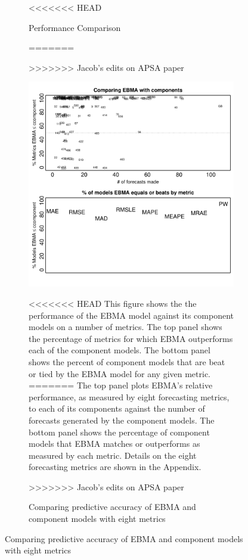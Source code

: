 \documentclass[12pt,fullpage,endnotes]{article}
\begin{document}
\begin{figure}[h]
\begin{figure}[h]
<<<<<<< HEAD
\caption{Performance Comparison}
=======
\caption{Comparing predictive accuracy of EBMA and component models with eight metrics}
>>>>>>> Jacob's edits on APSA paper
\label{compare2Components}
\begin{center}
\includegraphics{compare2Components}
\end{center}

<<<<<<< HEAD
\footnotesize This figure shows the the performance of the EBMA model against its component models on a number of metrics. The top panel shows the percentage of metrics for which EBMA outperforms each of the component models. The bottom panel shows the percent of component models that are beat or tied by the EBMA model for any given metric. 
=======
The top panel plots EBMA's relative performance, as measured by eight
forecasting metrics, to each of its components against the number of
forecasts generated by the component models.  The bottom panel shows
the percentage of component models that EBMA matches or outperforms as
measured by each metric.  Details on the eight forecasting metrics are
shown in the Appendix.

>>>>>>> Jacob's edits on APSA paper

\end{figure}


\end{figure}
\end{document}
